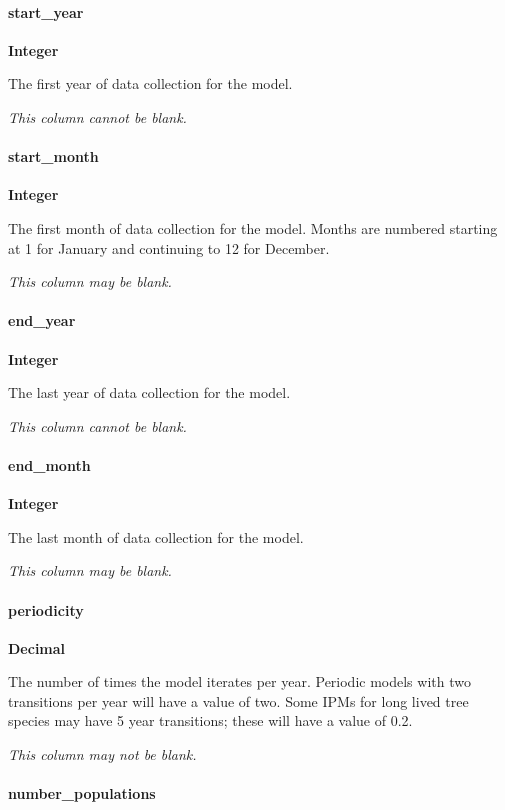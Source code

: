 \documentclass[]{article}
\let\oldparagraph\paragraph
\renewcommand{\paragraph}[1]{\oldparagraph{#1}\mbox{}}
\begin{document}
\paragraph{start\_year}\label{start_year}

\textbf{Integer}

The first year of data collection for the model.

\emph{This column cannot be blank.}

\paragraph{start\_month}\label{start_month}

\textbf{Integer}

The first month of data collection for the model. Months are numbered
starting at 1 for January and continuing to 12 for December.

\emph{This column may be blank.}

\paragraph{end\_year}\label{end_year}

\textbf{Integer}

The last year of data collection for the model.

\emph{This column cannot be blank.}

\paragraph{end\_month}\label{end_month}

\textbf{Integer}

The last month of data collection for the model.

\emph{This column may be blank.}

\paragraph{periodicity}\label{periodicity}

\textbf{Decimal}

The number of times the model iterates per year. Periodic models with
two transitions per year will have a value of two. Some IPMs for long
lived tree species may have 5 year transitions; these will have a value
of 0.2.

\emph{This column may not be blank.}

\paragraph{number\_populations}\label{number_populations}
\end{document}
